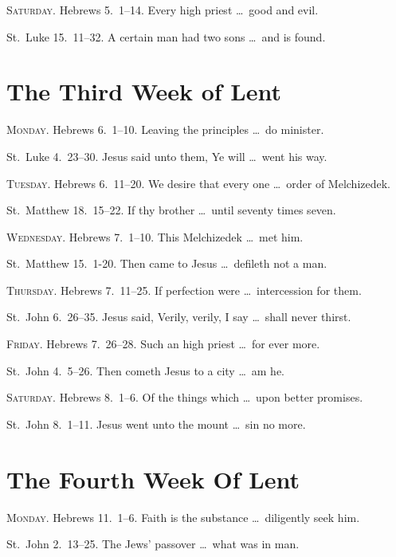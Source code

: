{\scshape Saturday.}  Hebrews 5.~1–14.   Every high priest \ldots\ good and evil.

 St.~Luke 15.~11–32.   A certain man had two sons \ldots\ and is found.

\section{The Third Week of Lent}

{\scshape Monday.}  Hebrews 6.~1–10.   Leaving the principles \ldots\ do minister.

 St.~Luke 4.~23–30.   Jesus said unto them, Ye will \ldots\ went his way.

{\scshape Tuesday.}  Hebrews 6.~11–20.   We desire that every one \ldots\ order of Melchizedek.

 St.~Matthew 18.~15–22.   If thy brother \ldots\ until seventy times seven.

{\scshape Wednesday.}  Hebrews 7.~1–10.   This Melchizedek \ldots\ met him.

 St.~Matthew 15.~1-20.   Then came to Jesus \ldots\ defileth not a man.

{\scshape Thursday.}  Hebrews 7.~11–25.   If perfection were \ldots\ intercession for them.

 St.~John 6.~26–35.   Jesus said, Verily, verily, I say \ldots\ shall never thirst.

{\scshape Friday.}  Hebrews 7.~26–28.   Such an high priest \ldots\ for ever more.

 St.~John 4.~5–26.   Then cometh Jesus to a city \ldots\ am he.

{\scshape Saturday.}  Hebrews 8.~1–6.   Of the things which \ldots\ upon better promises.

 St.~John 8.~1–11.   Jesus went unto the mount \ldots\ sin no more.

\section{The Fourth Week Of Lent}

{\scshape Monday.}  Hebrews 11.~1–6.   Faith is the substance \ldots\ diligently seek him.

 St.~John 2.~13–25.   The Jews’ passover \ldots\ what was in man.

